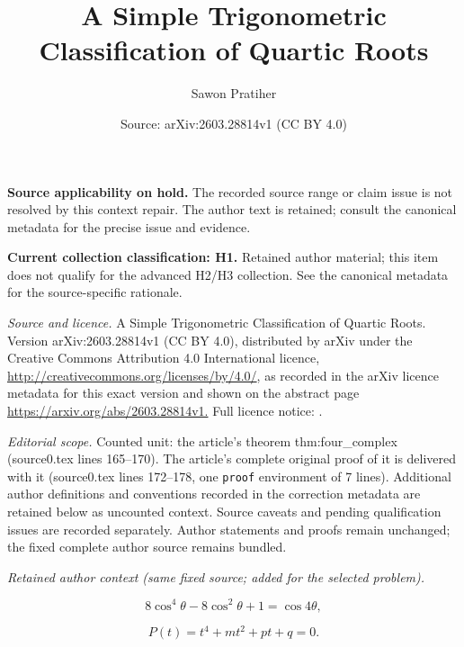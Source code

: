 \documentclass[10pt,a4paper]{amsart}
\title{A Simple Trigonometric Classification of Quartic Roots}
\author{Sawon Pratiher}
\date{Source: arXiv:2603.28814v1 (CC BY 4.0)}
\begin{document}
\maketitle
\par\medskip\noindent\textbf{Source applicability on hold.} The recorded source range or claim issue is not resolved by this context repair. The author text is retained; consult the canonical metadata for the precise issue and evidence.\par\medskip

\par\medskip\noindent\textbf{Current collection classification: H1.} Retained author material; this item does not qualify for the advanced H2/H3 collection. See the canonical metadata for the source-specific rationale.\par\medskip


{\sloppy \noindent\emph{Source and licence.} A Simple Trigonometric Classification of Quartic Roots. Version arXiv:2603.28814v1 (CC BY 4.0), distributed by arXiv under the Creative Commons Attribution 4.0 International licence, \url{http://creativecommons.org/licenses/by/4.0/}, as recorded in the arXiv licence metadata for this exact version and shown on the abstract page \url{https://arxiv.org/abs/2603.28814v1.} Full licence notice: .\par\smallskip\par}

\noindent\textit{Editorial scope.} Counted unit: the article's theorem thm:four\_complex (source0.tex lines 165--170). The article's complete original proof of it is delivered with it (source0.tex lines 172--178, one \texttt{proof} environment of 7 lines). Additional author definitions and conventions recorded in the correction metadata are retained below as uncounted context. Source caveats and pending qualification issues are recorded separately. Author statements and proofs remain unchanged; the fixed complete author source remains bundled.\par\medskip
\par\medskip\noindent\textit{Retained author context (same fixed source; added for the selected problem).}\par
\begin{equation}\label{eq:cheb4}
8\cos^4\theta - 8\cos^2\theta + 1 = \cos 4\theta,
\end{equation}

\begin{equation}\label{eq:depressed}
P(t) = t^4 + mt^2 + pt + q = 0.
\end{equation}
\end{document}
